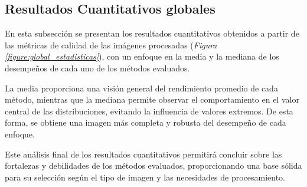 \documentclass[sigchi]{acmart}
\begin{document}
\newpage

\subsection{Resultados Cuantitativos globales} \label{subsec:resultados_cuantitativos}

En esta subsección se presentan los resultados cuantitativos obtenidos a partir de las métricas
de calidad de las imágenes procesadas (\emph{Figura \ref{figure:global_estadisticas}}), con un enfoque en la media y la mediana de los
desempeños de cada uno de los métodos evaluados.

La media proporciona una visión general del rendimiento promedio de cada método, mientras que
la mediana permite observar el comportamiento en el valor central de las distribuciones,
evitando la influencia de valores extremos. De esta forma, se obtiene una imagen más completa y
robusta del desempeño de cada enfoque.

Este análisis final de los resultados cuantitativos permitirá concluir sobre las fortalezas y
debilidades de los métodos evaluados, proporcionando una base sólida para su selección según el
tipo de imagen y las necesidades de procesamiento.
\end{document}
